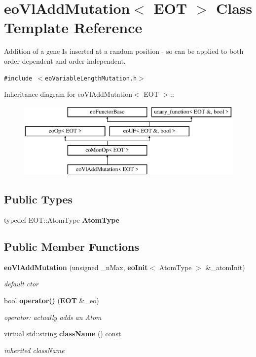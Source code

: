 \section{eo\-Vl\-Add\-Mutation$<$ EOT $>$ Class Template Reference}
\label{classeo_vl_add_mutation}
Addition of a gene Is inserted at a random position - so can be applied to both order-dependent and order-independent.  


{\tt \#include $<$eo\-Variable\-Length\-Mutation.h$>$}

Inheritance diagram for eo\-Vl\-Add\-Mutation$<$ EOT $>$::\begin{figure}[H]
\begin{center}
\leavevmode
\includegraphics[height=3.71476cm]{classeo_vl_add_mutation}
\end{center}
\end{figure}
\subsection*{Public Types}
\begin{CompactItemize}
\item 
typedef EOT::Atom\-Type {\bf Atom\-Type}\label{classeo_vl_add_mutation_w0}

\end{CompactItemize}
\subsection*{Public Member Functions}
\begin{CompactItemize}
\item 
{\bf eo\-Vl\-Add\-Mutation} (unsigned \_\-n\-Max, {\bf eo\-Init}$<$ Atom\-Type $>$ \&\_\-atom\-Init)
\begin{CompactList}\small\item\em default ctor \item\end{CompactList}\item 
bool {\bf operator()} ({\bf EOT} \&\_\-eo)\label{classeo_vl_add_mutation_a1}

\begin{CompactList}\small\item\em operator: actually adds an Atom \item\end{CompactList}\item 
virtual std::string {\bf class\-Name} () const \label{classeo_vl_add_mutation_a2}

\begin{CompactList}\small\item\em inherited class\-Name \item\end{CompactList}\end{CompactItemize}
